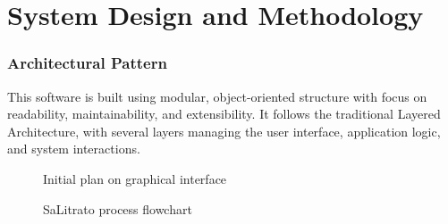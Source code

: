 \part{System Design and Methodology}

%
\section*{Architectural Pattern}

This software is built using modular, object-oriented structure with focus on readability,
maintainability, and extensibility. It follows the traditional Layered Architecture, with
several layers managing the user interface, application logic, and system interactions.

\hfill

\begin{figure}[hbt!]
    \center
    \noindent{}
    \caption{Initial plan on graphical interface}
    \label{fig:plannedUI}
\end{figure}

\newpage

\begin{figure}[hbt!]
    \center
    \noindent{}
    \caption{SaLitrato process flowchart}
    \label{fig:salitrato_flowchart}
\end{figure}
